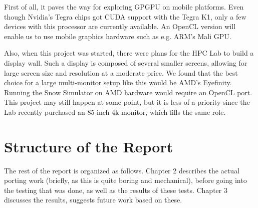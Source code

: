 First of all, it paves the way for exploring GPGPU on mobile platforms. Even though Nvidia's Tegra chips got CUDA support with the Tegra K1, only a few devices with this processor are currently available. An OpenCL version will enable us to use mobile graphics hardware such as e.g. ARM's Mali GPU.

Also, when this project was started, there were plans for the HPC Lab to build a display wall. Such a display is composed of several smaller screens, allowing for large screen size and resolution at a moderate price. We found that the best choice for a large multi-monitor setup like this would be AMD's Eyefinity. Running the Snow Simulator on AMD hardware would require an OpenCL port. This project may still happen at some point, but it is less of a priority since the Lab recently purchased an 85-inch 4k monitor, which fills the same role.

\section{Structure of the Report}
The rest of the report is organized as follows. Chapter 2 describes the actual porting work (briefly, as this is quite boring and mechanical), before going into the testing that was done, as well as the results of these tests. Chapter 3 discusses the results, suggests future work based on these.